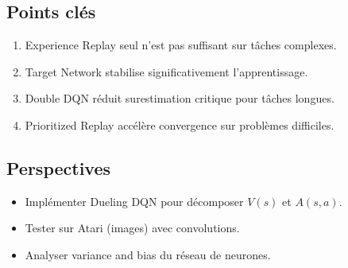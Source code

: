 \documentclass[12pt,a4paper]{article}
\begin{document}
\subsection{Points clés}

\begin{enumerate}
    \item Experience Replay seul n'est pas suffisant sur tâches complexes.
    \item Target Network stabilise significativement l'apprentissage.
    \item Double DQN réduit surestimation critique pour tâches longues.
    \item Prioritized Replay accélère convergence sur problèmes difficiles.
\end{enumerate}

\subsection{Perspectives}

\begin{itemize}
    \item Implémenter Dueling DQN pour décomposer $V(s)$ et $A(s,a)$.
    \item Tester sur Atari (images) avec convolutions.
    \item Analyser variance and bias du réseau de neurones.
\end{itemize}
\end{document}
